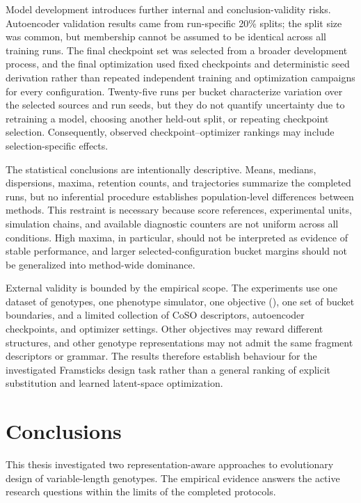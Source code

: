 Model development introduces further internal and conclusion-validity risks. Autoencoder validation results came from run-specific 20\% splits; the split size was common, but membership cannot be assumed to be identical across all training runs. The final checkpoint set was selected from a broader development process, and the final optimization used fixed checkpoints and deterministic seed derivation rather than repeated independent training and optimization campaigns for every configuration. Twenty-five runs per bucket characterize variation over the selected sources and run seeds, but they do not quantify uncertainty due to retraining a model, choosing another held-out split, or repeating checkpoint selection. Consequently, observed checkpoint--optimizer rankings may include selection-specific effects.

The statistical conclusions are intentionally descriptive. Means, medians, dispersions, maxima, retention counts, and trajectories summarize the completed runs, but no inferential procedure establishes population-level differences between methods. This restraint is necessary because score references, experimental units, simulation chains, and available diagnostic counters are not uniform across all conditions. High maxima, in particular, should not be interpreted as evidence of stable performance, and larger selected-configuration bucket margins should not be generalized into method-wide dominance.

External validity is bounded by the empirical scope. The experiments use one dataset of \fone{} genotypes, one phenotype simulator, one objective (\vertpos{}), one set of bucket boundaries, and a limited collection of CoSO descriptors, autoencoder checkpoints, and optimizer settings. Other objectives may reward different structures, and other genotype representations may not admit the same fragment descriptors or grammar. The results therefore establish behaviour for the investigated Framsticks design task rather than a general ranking of explicit substitution and learned latent-space optimization.

\section{Conclusions}

This thesis investigated two representation-aware approaches to evolutionary design of variable-length \fone{} genotypes. The empirical evidence answers the active research questions within the limits of the completed protocols.

